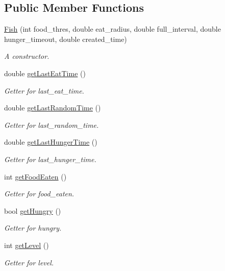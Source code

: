 \subsection*{Public Member Functions}
\begin{DoxyCompactItemize}
\item 
\mbox{\hyperlink{class_fish_addc65c182f7c916e854b381d7d5410e3}{Fish}} (int food\+\_\+thres, double eat\+\_\+radius, double full\+\_\+interval, double hunger\+\_\+timeout, double created\+\_\+time)
\begin{DoxyCompactList}\small\item\em A constructor. \end{DoxyCompactList}\item 
double \mbox{\hyperlink{class_fish_a5cc60f7e97c95136c19d54b4e49a5262}{get\+Last\+Eat\+Time}} ()
\begin{DoxyCompactList}\small\item\em Getter for last\+\_\+eat\+\_\+time. \end{DoxyCompactList}\item 
double \mbox{\hyperlink{class_fish_a4edfa0e606e5db4a648fdd5d016e1543}{get\+Last\+Random\+Time}} ()
\begin{DoxyCompactList}\small\item\em Getter for last\+\_\+random\+\_\+time. \end{DoxyCompactList}\item 
double \mbox{\hyperlink{class_fish_ab097bcfc0f0402bc1c9e048bf2351290}{get\+Last\+Hunger\+Time}} ()
\begin{DoxyCompactList}\small\item\em Getter for last\+\_\+hunger\+\_\+time. \end{DoxyCompactList}\item 
int \mbox{\hyperlink{class_fish_a5ff6258ba2d031b4cc815e8318bea135}{get\+Food\+Eaten}} ()
\begin{DoxyCompactList}\small\item\em Getter for food\+\_\+eaten. \end{DoxyCompactList}\item 
bool \mbox{\hyperlink{class_fish_aa4f43ec5e63aff8a1db32d530a91652d}{get\+Hungry}} ()
\begin{DoxyCompactList}\small\item\em Getter for hungry. \end{DoxyCompactList}\item 
int \mbox{\hyperlink{class_fish_a3f9ad26c3d1dfbc3d1334065691d55da}{get\+Level}} ()
\begin{DoxyCompactList}\small\item\em Getter for level. \end{DoxyCompactList}\item 

\end{DoxyCompactItemize}
